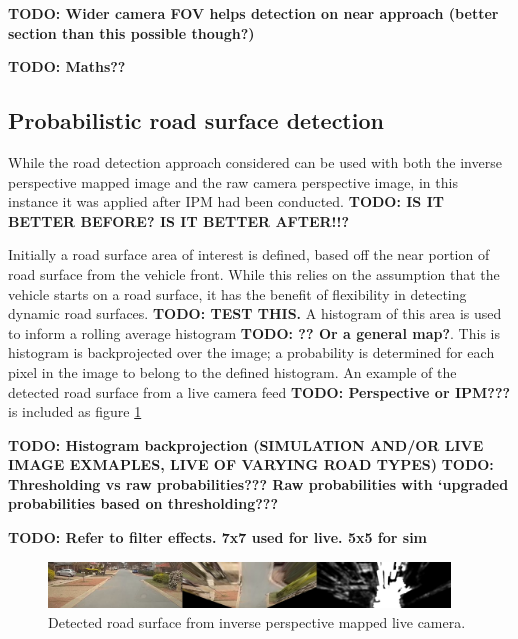 \documentclass[]{aiaa-tc}%
\begin{document}
\textbf{TODO: Wider camera FOV helps detection on near approach (better section than this possible though?)}

\textbf{TODO: Maths??}

\subsection{Probabilistic road surface detection}

While the road detection approach considered can be used with both the inverse perspective mapped image and the raw camera perspective image, in this instance it was applied after IPM had been conducted. \textbf{TODO: IS IT BETTER BEFORE? IS IT BETTER AFTER!!?}

Initially a road surface area of interest is defined, based off the near portion of road surface from the vehicle front. While this relies on the assumption that the vehicle starts on a road surface, it has the benefit of flexibility in detecting dynamic road surfaces. \textbf{TODO: TEST THIS.} A histogram of this area is used to inform a rolling average histogram \textbf{TODO: ?? Or a general map?}. This is histogram is backprojected over the image; a probability is determined for each pixel in the image to belong to the defined histogram. An example of the detected road surface from a live camera feed \textbf{TODO: Perspective or IPM???} is included as figure \ref{f:histRoadLive}


\textbf{TODO: Histogram backprojection (SIMULATION AND/OR LIVE IMAGE EXMAPLES, LIVE OF VARYING ROAD TYPES)}
\textbf{TODO: Thresholding vs raw probabilities??? Raw probabilities with `upgraded probabilities based on thresholding???}

\textbf{TODO: Refer to filter effects. 7x7 used for live. 5x5 for sim}


\begin{figure}
	\includegraphics[width=0.95\textwidth]{RoadDetection/histRoadLive.png}
	\caption{Detected road surface from inverse perspective mapped live camera.}
	\label{f:histRoadLive}
\end{figure}
\end{document}
